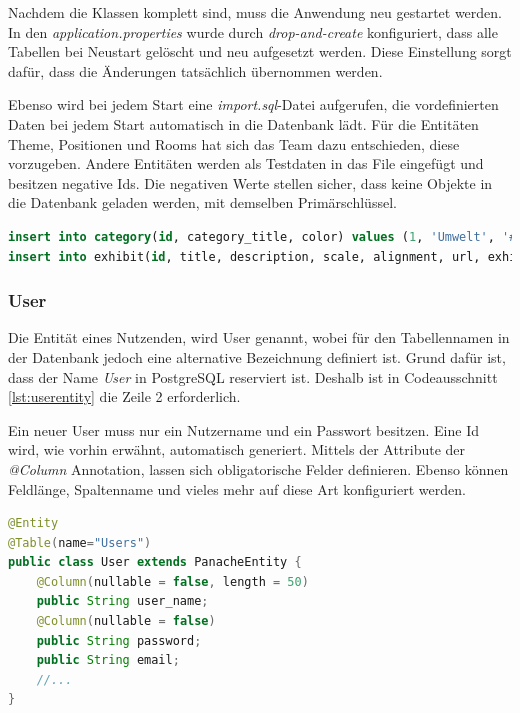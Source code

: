 Nachdem die Klassen komplett sind, muss die Anwendung neu gestartet werden. 
In den \emph{application.properties} wurde durch \emph{drop-and-create} konfiguriert, dass alle Tabellen bei Neustart gelöscht und neu aufgesetzt werden. 
Diese Einstellung sorgt dafür, dass die Änderungen tatsächlich übernommen werden. 

Ebenso wird bei jedem Start eine \emph{import.sql}-Datei aufgerufen, die vordefinierten Daten bei jedem Start automatisch in die Datenbank lädt.  
Für die Entitäten Theme, Positionen und Rooms hat sich das Team dazu entschieden, diese vorzugeben. 
Andere Entitäten werden als Testdaten in das File eingefügt und besitzen negative Ids. 
Die negativen Werte stellen sicher, dass keine Objekte in die Datenbank geladen werden, mit demselben Primärschlüssel.

\begin{lstlisting}[label=lst:importsql, language=sql, caption=Ausschnitt import.sql]
insert into category(id, category_title, color) values (1, 'Umwelt', '#C1BAFF'), (2, 'Tiere', '#ADD0FF');
insert into exhibit(id, title, description, scale, alignment, url, exhibition_id, position_id, data_type) values (-20, 'Art Blob', 'Sculpture made by Lorenz Litzlanze', 40, 'c', 'example-exhibits/abstraktArtBlob.gltf', -3, 2, 'gltf');
\end{lstlisting}

\subsubsection{User}
Die Entität eines Nutzenden, wird User genannt, wobei für den Tabellennamen in der Datenbank jedoch eine alternative Bezeichnung definiert ist.
Grund dafür ist, dass der Name \emph{User} in PostgreSQL reserviert ist. 
Deshalb ist in Codeausschnitt \ref{lst:userentity} die Zeile 2 erforderlich.

Ein neuer User muss nur ein Nutzername und ein Passwort besitzen.
Eine Id wird, wie vorhin erwähnt, automatisch generiert. 
Mittels der Attribute der \emph{@Column} Annotation, lassen sich obligatorische Felder definieren.
Ebenso können Feldlänge, Spaltenname und vieles mehr auf diese Art konfiguriert werden.

\begin{lstlisting}[label=lst:userentity, language=Java, caption=Teil der Entity-Klasse des Users]
@Entity
@Table(name="Users")        
public class User extends PanacheEntity {
    @Column(nullable = false, length = 50)
    public String user_name;
    @Column(nullable = false)
    public String password;
    public String email;
    //...
}
\end{lstlisting}

